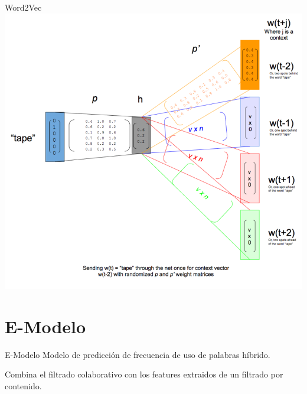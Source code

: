 \documentclass[table]{beamer}
\begin{document}
  \begin{frame}{Word2Vec}
      \centering
      \includegraphics[scale=0.65]{./figures/skip-gram-exp.png}
  \end{frame}

  \section{E-Modelo}

  \begin{frame}{E-Modelo}
      Modelo de predicción de frecuencia de uso de palabras híbrido.

      Combina el filtrado colaborativo con los features extraidos de un filtrado por contenido.
  \end{frame}
\end{document}
